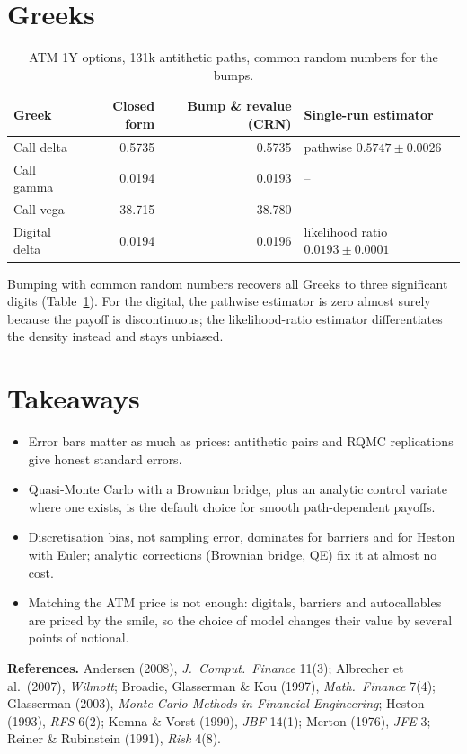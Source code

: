 \documentclass[11pt,a4paper]{article}
\begin{document}
\section{Greeks}
\begin{table}[h]
\centering\small
\begin{tabular}{lrrl}
\toprule
Greek & Closed form & Bump \& revalue (CRN) & Single-run estimator \\
\midrule
Call delta & 0.5735 & 0.5735 & pathwise $0.5747\pm0.0026$ \\
Call gamma & 0.0194 & 0.0193 & -- \\
Call vega & 38.715 & 38.780 & -- \\
Digital delta & 0.0194 & 0.0196 & likelihood ratio $0.0193\pm0.0001$ \\
\bottomrule
\end{tabular}
\caption{ATM 1Y options, 131k antithetic paths, common random numbers for the bumps.}
\label{tab:greeks}
\end{table}

Bumping with common random numbers recovers all Greeks to three significant digits
(Table~\ref{tab:greeks}). For the digital, the pathwise estimator is zero almost surely because
the payoff is discontinuous; the likelihood-ratio estimator differentiates the density instead
and stays unbiased.

\section{Takeaways}
\begin{itemize}
\item Error bars matter as much as prices: antithetic pairs and RQMC replications give honest
standard errors.
\item Quasi-Monte Carlo with a Brownian bridge, plus an analytic control variate where one exists,
is the default choice for smooth path-dependent payoffs.
\item Discretisation bias, not sampling error, dominates for barriers and for Heston with Euler;
analytic corrections (Brownian bridge, QE) fix it at almost no cost.
\item Matching the ATM price is not enough: digitals, barriers and autocallables are priced by the
smile, so the choice of model changes their value by several points of notional.
\end{itemize}

\vspace{0.3em}
{\small\textbf{References.} Andersen (2008), \emph{J.\ Comput.\ Finance} 11(3);
Albrecher et al.\ (2007), \emph{Wilmott}; Broadie, Glasserman \& Kou (1997), \emph{Math.\ Finance} 7(4);
Glasserman (2003), \emph{Monte Carlo Methods in Financial Engineering}; Heston (1993), \emph{RFS} 6(2);
Kemna \& Vorst (1990), \emph{JBF} 14(1); Merton (1976), \emph{JFE} 3; Reiner \& Rubinstein (1991), \emph{Risk} 4(8).}
\end{document}
